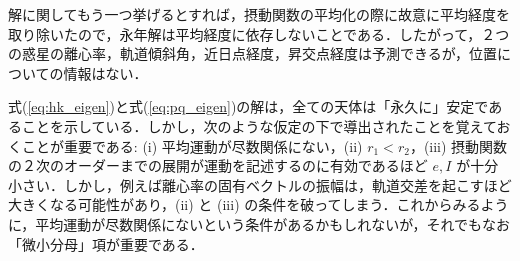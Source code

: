 \documentclass[11pt,a4paper,oneside,onecolumn]{jreport}
\begin{document}
解に関してもう一つ挙げるとすれば，摂動関数の平均化の際に故意に平均経度を取り除いたので，永年解は平均経度に依存しないことである．したがって，２つの惑星の離心率，軌道傾斜角，近日点経度，昇交点経度は予測できるが，位置についての情報はない．

式(\ref{eq:hk_eigen})と式(\ref{eq:pq_eigen})の解は，全ての天体は「永久に」安定であることを示している．しかし，次のような仮定の下で導出されたことを覚えておくことが重要である: (i) 平均運動が尽数関係にない，(ii) $r_1 < r_2$，(iii) 摂動関数の２次のオーダーまでの展開が運動を記述するのに有効であるほど $e, I$ が十分小さい．しかし，例えば離心率の固有ベクトルの振幅は，軌道交差を起こすほど大きくなる可能性があり，(ii) と (iii) の条件を破ってしまう．これからみるように，平均運動が尽数関係にないという条件があるかもしれないが，それでもなお「微小分母」項が重要である．
\end{document}
